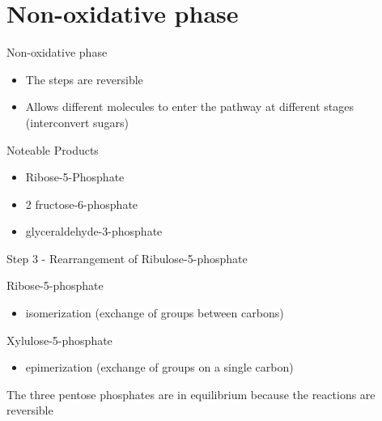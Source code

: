 \documentclass[bigger]{beamer}
\begin{document}
\section{Non-oxidative phase}
\label{sec:org6eb6c99}

\begin{frame}[label={sec:org6f4f688}]{Non-oxidative phase}
\begin{itemize}
\item The steps are \alert{reversible}
\item Allows different molecules to enter the pathway at different stages
(interconvert sugars)
\end{itemize}
\begin{block}{Noteable Products}
\begin{itemize}
\item Ribose-5-Phosphate
\item 2 fructose-6-phosphate
\item glyceraldehyde-3-phosphate
\end{itemize}
\end{block}
\end{frame}

\begin{frame}[label={sec:org13fb0ca}]{Step 3 - Rearrangement of Ribulose-5-phosphate}
\begin{block}{Ribose-5-phosphate}
\begin{itemize}
\item isomerization (exchange of groups between carbons)
\end{itemize}
\end{block}
\begin{block}{Xylulose-5-phosphate}
\begin{itemize}
\item epimerization (exchange of groups on a single carbon)
\end{itemize}
\end{block}

\begin{block}{The three pentose phosphates are in equilibrium because the reactions are reversible}
\end{block}
\end{frame}
\end{document}
